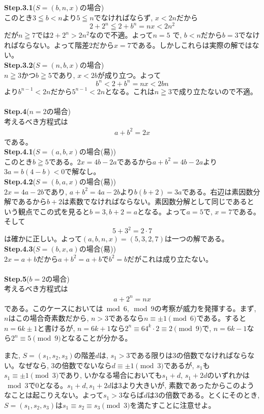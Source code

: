 \documentclass[twocolumn]{jbook}
\renewcommand{\leq}{\leqq}
\renewcommand{\geq}{\geqq}
\newcommand{\step}[2]{{\Large \textbf{Step.#1}}(#2)}
\begin{document}
\step{3.1}{$S=(b,n,x)$の場合}\\
このとき$3\leq b<n$より$5\leq n$でなければならず, $x<2n$だから
\[2+2^{n} \leq 2+b^{n} = nx < 2n^2\]
だが$n\geq 7$では$2+2^{n} > 2n^2$なので不適。よって$n=5$
で, $b<n$だから$b=3$でなければならない。よって階差$2$だから$x=7$である。しかしこれらは実際の解ではない。\\
\step{3.2}{$S=(n,b,x)$の場合}\\
$n\geq 3$かつ$b\geq 5$であり, $x<2b$が成り立つ。よって
\[b^{n} < 2+b^{n} = nx < 2bn\]
より$b^{n-1} < 2n$だから$5^{n-1} < 2n$となる。これは$n\geq 3$で成り立たないので不適。\\
\\
\step{4}{$n=2$の場合}\\
考えるべき方程式は
\begin{eqnarray}
a+b^{2} = 2x\label{eqnarray:3}
\end{eqnarray}
である。\\
\step{4.1}{$S=(a,b,x)$の場合(易)}\\
このとき$b\geq 5$である。$2x = 4b-2a$であるから$a+b^2 = 4b-2a$より$3a = b(4-b) < 0$で解なし。\\
\step{4.2}{$S=(b,a,x)$の場合(易)}\\
$2x=4a - 2b$であり, $a+b^2 = 4a - 2b$より$b(b+2)=3a$である。右辺は素因数分解であるから$b+2$は素数でなければならない。素因数分解として同じであるという観点でこの式を見ると$b=3, b+2 = a$となる。よって$a=5$で, $x=7$である。そして
\[5 + 3^2 = 2\cdot 7\]
は確かに正しい。よって$(a,b,n,x) = (5,3,2,7)$は一つの解である。\\
\step{4.3}{$S=(b,x,a)$の場合(易)}\\
$2x = a+b$だから$a+b^2 = a+b$で$b^2 = b$だがこれは成り立たない。\\
\\
\step{5}{$b=2$の場合}\\
考えるべき方程式は
\begin{eqnarray}
a+2^{n} = nx\label{eqnarray:2}
\end{eqnarray}
である。このケースにおいては$\bmod{6}, \bmod{9}$の考察が威力を発揮する。まず, $n$はこの場合奇素数だから, $n>3$であるなら$n\equiv \pm 1\pmod{6}$である。すると$n=6k\pm 1$と書けるが, $n=6k+1$なら$2^{n} \equiv 64^{k}\cdot 2 \equiv 2\pmod{9}$で, $n=6k-1$なら$2^{n}\equiv 5\pmod{9}$となることが分かる。\par
また, $S=(s_1,s_2,s_3)$の階差$d$は, $s_1>3$である限りは3の倍数でなければならない。なぜなら, $3$の倍数でないなら$d\equiv \pm 1\pmod{3}$であるが, $s_1$も$s_1\equiv \pm 1 \pmod{3}$であり, いかなる場合においても$s_1+d$, $s_1+2d$のいずれかは$\bmod{3}$で0となる。$s_1+d,s_1+2d$は3より大きいが, 素数であったからこのようなことは起こりえない。よって$s_1>3$ならば$d$は3の倍数である。とくにそのとき,  $S=(s_1,s_2,s_3)$は$s_1\equiv s_2\equiv s_3\pmod{3}$を満たすことに注意せよ。\\
\end{document}
